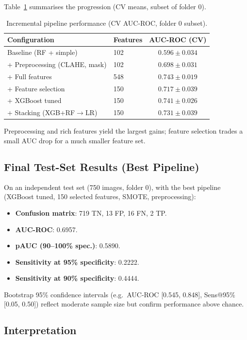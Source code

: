 \documentclass[11pt,a4paper]{article}
\begin{document}
Table~\ref{tab:progression} summarises the progression (CV means, subset of folder 0).

\begin{table}[h]
\centering
\caption{Incremental pipeline performance (CV AUC-ROC, folder 0 subset).}
\label{tab:progression}
\begin{tabular}{llc}
\toprule
Configuration & Features & AUC-ROC (CV) \\
\midrule
Baseline (RF + simple) & 102 & $0.596 \pm 0.034$ \\
+ Preprocessing (CLAHE, mask) & 102 & $0.698 \pm 0.031$ \\
+ Full features & 548 & $0.743 \pm 0.019$ \\
+ Feature selection & 150 & $0.717 \pm 0.039$ \\
+ XGBoost tuned & 150 & $0.741 \pm 0.026$ \\
+ Stacking (XGB+RF$\to$LR) & 150 & $0.731 \pm 0.039$ \\
\bottomrule
\end{tabular}
\end{table}

Preprocessing and rich features yield the largest gains; feature selection trades a small AUC drop for a much smaller feature set.

\subsection{Final Test-Set Results (Best Pipeline)}

On an independent test set (750 images, folder 0), with the best pipeline (XGBoost tuned, 150 selected features, SMOTE, preprocessing):

\begin{itemize}
  \item \textbf{Confusion matrix}: 719 TN, 13 FP, 16 FN, 2 TP.
  \item \textbf{AUC-ROC}: 0.6957.
  \item \textbf{pAUC (90--100\% spec.)}: 0.5890.
  \item \textbf{Sensitivity at 95\% specificity}: 0.2222.
  \item \textbf{Sensitivity at 90\% specificity}: 0.4444.
\end{itemize}

Bootstrap 95\% confidence intervals (e.g.\ AUC-ROC [0.545, 0.848], Sens@95\% [0.05, 0.50]) reflect moderate sample size but confirm performance above chance.

\subsection{Interpretation}
\end{document}

